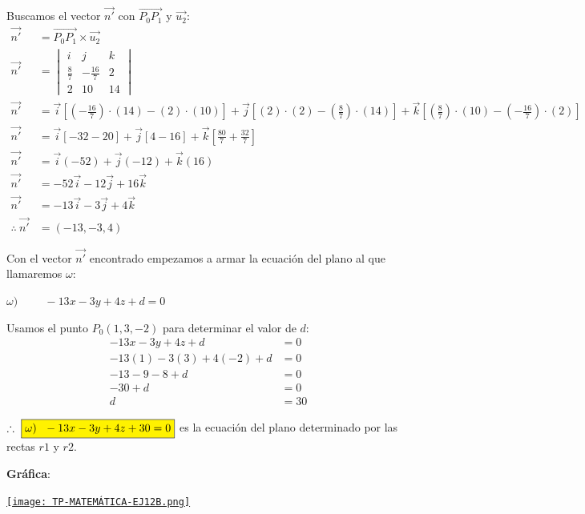 \noindent Buscamos el vector $\vec{n'}$ con $\overrightarrow{P_0P_1}$ y $\vec{u_2}$:
\begin{align*}
	\vec{n'}              & = \overrightarrow{P_0P_1} \times \vec{u_2}                         \\
	\vec{n'}              & = \begin{vmatrix}
		                          i           & j             & k  \\
		                          \frac{8}{7} & -\frac{16}{7} & 2  \\
		                          2           & 10            & 14
	                          \end{vmatrix}                                 \\
	\vec{n'}              & = \vec{i} \left[(-\frac{16}{7})\cdot(14) - (2)\cdot(10) \right]  +
	\vec{j} \left[ (2)\cdot(2) - (\frac{8}{7})\cdot(14) \right] +
	\vec{k} \left[ (\frac{8}{7})\cdot(10) - (-\frac{16}{7})\cdot(2) \right]                    \\
	\vec{n'}              & = \vec{i} \left[-32 - 20 \right]  +
	\vec{j} \left[ 4 - 16 \right] +
	\vec{k} \left[ \frac{80}{7} + \frac{32}{7} \right]                                         \\
	\vec{n'}              & = \vec{i} (-52) + \vec{j} (- 12) + \vec{k} (16)                    \\
	\vec{n'}              & = -52\vec{i}- 12\vec{j} + 16\vec{k}                                \\
	\vec{n'}              & = -13\vec{i}- 3\vec{j} + 4\vec{k}                                  \\
	\therefore \ \vec{n'} & = \boxed{(-13, -3, 4)}
\end{align*}

\noindent Con el vector $\vec{n'}$ encontrado empezamos a armar la ecuación del plano al que llamaremos $\omega$:
\begin{center}
	$\omega) \hspace{1cm} -13x - 3y + 4z + d = 0$
\end{center}

\noindent Usamos el punto $P_0(1, 3, -2)$ para determinar el valor de $d$:
\begin{align*}
	-13x - 3y + 4z + d        & = 0          \\
	-13(1) - 3(3) + 4(-2) + d & = 0          \\
	-13 - 9 - 8 + d           & = 0          \\
	-30 + d                   & = 0          \\
	d                         & = \boxed{30}
\end{align*}

\noindent $\therefore \ \fcolorbox{black}{yellow}{$\omega) \ \ -13x - 3y + 4z + 30 = 0$}$ es la ecuación del plano determinado por las rectas $r1$ y $r2$.

\vspace{2cm}
\noindent \textbf{Gráfica}:
\begin{center}
	\href{https://www.geogebra.org/3d/n89vhber}{\texttt{[image: TP-MATEMÁTICA-EJ12B.png]}}
\end{center}